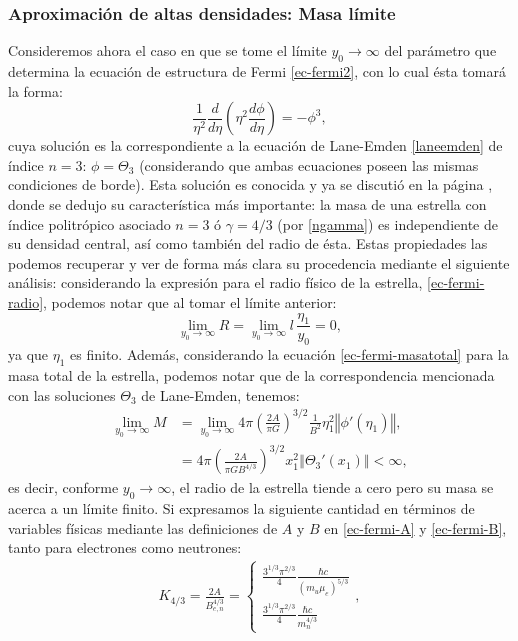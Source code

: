 \subsubsection{Aproximación de altas densidades: Masa límite}\label{sec:ec-fermi-masalimite}
Consideremos ahora el caso en que se tome el límite $y_0\to\infty$ del parámetro que determina la ecuación de estructura de Fermi \eqref{ec-fermi2}, con lo cual ésta tomará la forma:
\begin{equation}
\frac{1}{\eta^2}\frac{d}{d\eta}\left(\eta^2\frac{d\phi}{d\eta}\right)=-\phi^3,
\end{equation}
cuya solución es la correspondiente a la  ecuación de Lane-Emden \eqref{laneemden} de índice $n=3$: $\phi=\Theta_{3}$ (considerando que ambas ecuaciones poseen las mismas condiciones de borde). Esta solución es conocida y ya se discutió en la página \pageref{masa4/3}, donde se dedujo su característica más importante: la masa de una estrella con índice politrópico asociado  $n=3$ ó $\gamma=4/3$ (por \eqref{ngamma}) es independiente de su densidad central, así como también del radio de ésta. Estas propiedades las podemos recuperar y ver de forma más clara su procedencia mediante el siguiente análisis: considerando la expresión para el radio físico de la estrella, \eqref{ec-fermi-radio}, podemos notar que al tomar el límite anterior:
\begin{equation}
 \lim_{y_0\to\infty}R=\lim_{y_0\to\infty}l\,\frac{\eta_1}{y_0}=0,
\end{equation}
ya que $\eta_1$ es finito. Además, considerando la ecuación \eqref{ec-fermi-masatotal} para la masa total de la estrella, podemos notar que de la correspondencia mencionada con las soluciones $\Theta_3$ de Lane-Emden, tenemos:
\begin{align}
 \lim_{y_0\to\infty}M&= \lim_{y_0\to\infty}4\pi\left(\frac{2A}{\pi G}\right)^{3/2}\frac{1}{B^2}\eta_1^2\left\Vert\phi'(\eta_1)\right\Vert,\\
&=4\pi\left(\frac{2A}{\pi GB^{4/3}}\right)^{3/2}x_1^2\left\Vert\Theta_3'(x_1)\right\Vert<\infty,\label{ec-fermi-masachandra}
\end{align}
es decir, conforme $y_0\to\infty$, el radio de la estrella tiende a cero pero su masa se acerca a un límite finito. Si expresamos la siguiente cantidad en términos de variables físicas mediante las definiciones de $A$ y $B$ en \eqref{ec-fermi-A} y \eqref{ec-fermi-B}, tanto para electrones como neutrones:
\begin{align}\label{ec-fermi-k4/3}
 K_{4/3}=\frac{2A}{B_{e,n}^{4/3}}=\begin{cases}
\frac{3^{1/3}\pi^{2/3}}{4}\frac{\hbar c }{(m_u\mu_e)^{5/3}}\\
\frac{3^{1/3}\pi^{2/3}}{4}\frac{\hbar c }{m_n^{4/3}}
\end{cases},
\end{align}
